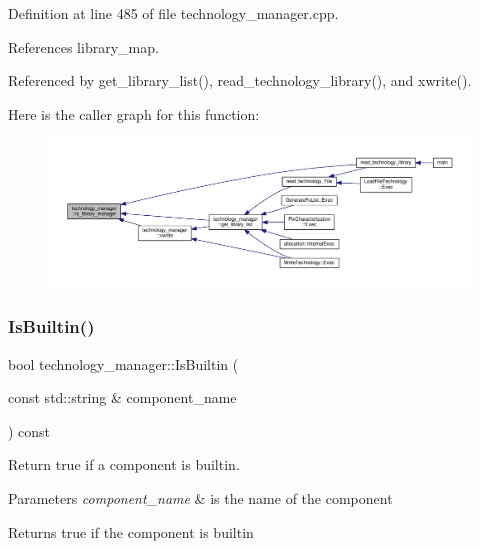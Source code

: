 Definition at line 485 of file technology\+\_\+manager.\+cpp.



References library\+\_\+map.



Referenced by get\+\_\+library\+\_\+list(), read\+\_\+technology\+\_\+library(), and xwrite().

Here is the caller graph for this function\+:
\nopagebreak
\begin{figure}[H]
\begin{center}
\leavevmode
\includegraphics[width=350pt]{df/dc7/classtechnology__manager_ae07845b64a58c7b505ee7efe03f5c220_icgraph}
\end{center}
\end{figure}
\mbox{\label{classtechnology__manager_a32b1731a83b59180ae9eadb890b99486}} 
\subsubsection{\texorpdfstring{Is\+Builtin()}{IsBuiltin()}}
{\footnotesize\ttfamily bool technology\+\_\+manager\+::\+Is\+Builtin (\begin{DoxyParamCaption}\item[{const std\+::string \&}]{component\+\_\+name }\end{DoxyParamCaption}) const}



Return true if a component is builtin. 


\begin{DoxyParams}{Parameters}
{\em component\+\_\+name} & is the name of the component \\
\hline
\end{DoxyParams}
\begin{DoxyReturn}{Returns}
true if the component is builtin 
\end{DoxyReturn}


